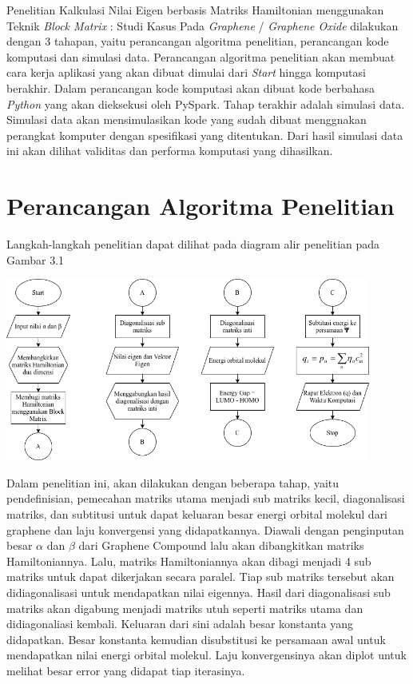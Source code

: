 \documentclass[12pt,a4paper]{report}
\begin{document}
Penelitian Kalkulasi Nilai Eigen berbasis Matriks Hamiltonian menggunakan Teknik \textit{Block Matrix} : Studi Kasus Pada \textit{Graphene} / \textit{Graphene Oxide} dilakukan dengan 3 tahapan, yaitu perancangan algoritma penelitian, perancangan kode komputasi dan simulasi data. Perancangan algoritma penelitian akan membuat cara kerja aplikasi yang akan dibuat dimulai dari \textit{Start} hingga komputasi berakhir. Dalam perancangan kode komputasi akan dibuat kode berbahasa \textit{Python} yang akan dieksekusi oleh PySpark. Tahap terakhir adalah simulasi data. Simulasi data akan mensimulasikan kode yang sudah dibuat menggnakan perangkat komputer dengan spesifikasi yang ditentukan. Dari hasil simulasi data ini akan dilihat validitas dan performa komputasi yang dihasilkan.

	\section{Perancangan Algoritma Penelitian}
		Langkah-langkah penelitian dapat dilihat pada diagram alir penelitian pada Gambar 3.1
	\begin{center}
		\includegraphics[width=12cm]{gambar/diagram_alir.png}
	\end{center}
	 Dalam penelitian ini, akan dilakukan dengan beberapa tahap, yaitu pendefinisian, pemecahan matriks utama menjadi sub matriks kecil, diagonalisasi matriks, dan subtitusi untuk dapat keluaran besar energi orbital molekul dari graphene dan laju konvergensi yang didapatkannya. Diawali dengan penginputan besar {$\alpha$} dan {$\beta$} dari Graphene Compound lalu akan dibangkitkan matriks Hamiltoniannya. Lalu, matriks Hamiltoniannya akan dibagi menjadi 4 sub matriks untuk dapat dikerjakan secara paralel. Tiap sub matriks tersebut akan didiagonalisasi untuk mendapatkan nilai eigennya. Hasil dari diagonalisasi sub matriks akan digabung menjadi matriks utuh seperti matriks utama dan didiagonaliasi kembali. Keluaran dari sini adalah besar konstanta yang didapatkan. Besar konstanta kemudian disubstitusi ke persamaan awal untuk mendapatkan nilai energi orbital molekul. Laju konvergensinya akan diplot untuk melihat besar error yang didapat tiap iterasinya.
\end{document}
